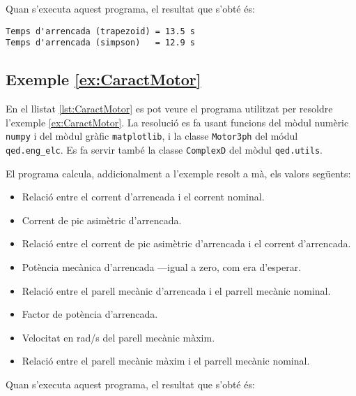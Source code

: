 Quan s'executa aquest programa, el resultat que s'obté és:
\lstset{
	language=,
	numbers=none,
	frame=none
}
\begin{lstlisting}
Temps d'arrencada (trapezoid) = 13.5 s
Temps d'arrencada (simpson)   = 12.9 s
\end{lstlisting} 


\hypertarget{exemple:CaractMotor}{\subsection{Exemple \ref*{ex:CaractMotor} \CaractMotor}}
En el llistat \vref{lst:CaractMotor} es pot veure el programa utilitzat per resoldre l'exemple \vref{ex:CaractMotor}. La resolució es fa usant funcions del mòdul numèric \texttt{numpy} i del mòdul gràfic \texttt{matplotlib}, i la classe \texttt{Motor3ph} del módul \texttt{qed.eng\_elc}. Es fa servir també la classe \texttt{ComplexD} del mòdul \texttt{qed.utils}.


El programa calcula, addicionalment a l'exemple resolt a mà, els valors següents: 
\begin{itemize}
	\item Relació entre el corrent d'arrencada i el corrent nominal.
	\item Corrent de pic asimètric d'arrencada.
	\item Relació entre el corrent de pic asimètric d'arrencada i el corrent d'arrencada.
	\item   Potència mecànica d'arrencada ---igual a zero, com era d'esperar.
	\item Relació entre el parell mecànic d'arrencada i el parrell mecànic nominal.
	\item Factor de potència d'arrencada.
	\item Velocitat en rad/s del parell mecànic màxim.
	\item Relació entre el parell mecànic màxim i el parrell mecànic nominal.
\end{itemize}

Quan s'executa aquest programa, el resultat que s'obté és:
\lstset{
	language=,
	numbers=none,
	frame=none
}

